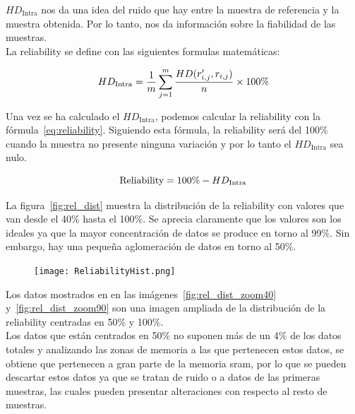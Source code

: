 \documentclass[spanish]{template/minim}
\begin{document}
$HD_{\text{Intra}}$ nos da una idea del ruido que hay entre la muestra de referencia y la muestra obtenida. Por lo tanto, nos da información sobre la fiabilidad de las muestras.\\

La reliability se define con las siguientes formulas matemáticas:

\begin{equation}
    \centering
    HD_{\text{Intra}} = \frac{1}{m} \sum\limits^m_{j=1} \frac{HD(r'_{i,j},r_{i,j})}{n} \times 100\%
    \label{eq:hd_intra_rel}
\end{equation}

Una vez se ha calculado el $HD_{\text{Intra}}$, podemos calcular la reliability con la fórmula~\ref{eq:reliability}. Siguiendo esta fórmula, la reliability será del 100\% cuando la muestra no presente ninguna variación y por lo tanto el $HD_{\text{Intra}}$ sea nulo.

\begin{equation}
    \centering
    \text{Reliability} = 100\% - HD_{\text{Intra}}
    \label{eq:reliability}
\end{equation}

 La figura~\ref{fig:rel_dist} muestra la distribución de la reliability con valores que van desde el 40\% hasta el 100\%. Se aprecia claramente que los valores son los ideales ya que la mayor concentración de datos se produce en torno al 99\%. Sin embargo, hay una pequeña aglomeración de datos en torno al 50\%.\\


 \begin{figure}[H]
    \centering
    \texttt{[image: ReliabilityHist.png]}
 \end{figure}


 Los datos mostrados en en las imágenes~\ref{fig:rel_dist_zoom40} y~\ref{fig:rel_dist_zoom90} son una imagen ampliada de la distribución de la reliability centradas en 50\% y 100\%.\\

 Los datos que están centrados en 50\% no suponen más de un 4\% de los datos totales y analizando las zonas de memoria a las que pertenecen estos datos, se obtiene que pertenecen a gran parte de la memoria \gls{sram}, por lo que se pueden descartar estos datos ya que se tratan de ruido o a datos de las primeras muestras, las cuales pueden presentar alteraciones con respecto al resto de muestras.\\
\end{document}
